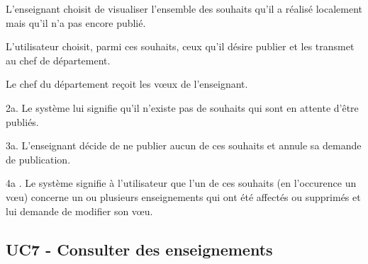 \begin{ocl}
\begin{scenario}
	\item L'enseignant choisit de visualiser l'ensemble des souhaits qu'il a réalisé localement mais qu'il n'a pas encore publié.
	\item L'utilisateur choisit, parmi ces souhaits, ceux qu'il désire publier et les transmet au chef de département.
	\item Le chef du département reçoit les vœux de l'enseignant.
\end{scenario}

 \begin{extension}
	 \item [2a.] Le système lui signifie qu'il n'existe pas de souhaits qui sont en attente d'être publiés.
	 \item [3a.] L'enseignant décide de ne publier aucun de ces souhaits et annule sa demande de publication.
	 \item [4a]. Le système signifie à l'utilisateur que l'un de ces souhaits (en l'occurence un v\oe u) concerne un ou plusieurs enseignements qui ont été affectés ou supprimés et lui demande de modifier son vœu.\\
 \end{extension}


 \subsection{UC7 - Consulter des enseignements}


\end{ocl}
